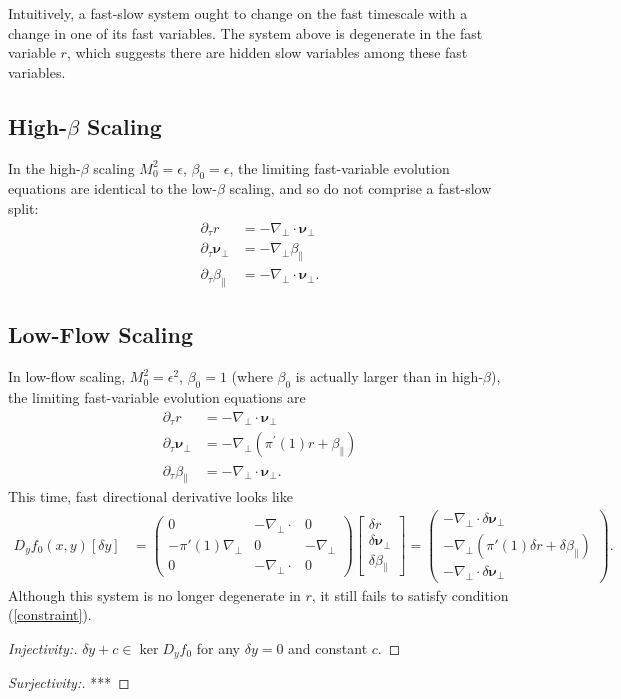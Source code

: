 \documentclass{article}
\newcommand{\para}{\parallel}
\newcommand{\ep}{\epsilon}
\newcommand{\np}{\nabla_\perp}
\newcommand{\p}{\partial}
\newcommand{\pth} [1] {\left( #1 \right) }
\newcommand{\bmat} [1] {\begin{bmatrix} #1 \end{bmatrix}}
\newcommand{\pmat} [1] {\begin{pmatrix} #1 \end{pmatrix}}
\begin{document}
Intuitively, a fast-slow system ought to change on the fast timescale with a change in one of its fast variables. The system above is degenerate in the fast variable $r$, which suggests there are hidden slow variables among these fast variables.


\subsection{High-$\beta$ Scaling}
In the high-$\beta$ scaling $M_0^2 = \ep$, $\beta_0 = \ep$, the limiting fast-variable evolution equations are identical to the low-$\beta$ scaling, and so do not comprise a fast-slow split:
\begin{align*}
\p_\tau r & = -\np\cdot\bm{\nu}_\perp\\
\p_\tau \bm{\nu}_\perp & = -\np\beta_\para\\
\p_\tau \beta_\para & = -\np\cdot\bm{\nu}_\perp.
\end{align*}

\subsection{Low-Flow Scaling}
In low-flow scaling, $M_0^2 = \epsilon^2$, $\beta_0 = 1$ (where $\beta_0$ is actually larger than in high-$\beta$), the limiting fast-variable evolution equations are
\begin{align*}
\p_\tau r &= -\np\cdot\bm{\nu}_\perp\\
\p_\tau \bm{\nu}_\perp & = -\np (\pi^\prime(1)r + \beta_\para)\\
\p_\tau \beta_\para & = -\np\cdot\bm{\nu}_\perp.
\end{align*}
This time, fast directional derivative looks like 
\begin{align} 
    D_yf_0(x,y) [\delta y] 
    &= \pmat{0 & -\np \cdot & 0 \\ -\pi'(1)\np & 0 & -\np \\ 0 & -\np \cdot & 0}
    \bmat{\delta r \\ \delta \bm{\nu}_\perp \\ \delta \beta_\para} = \pmat{-\np \cdot \delta \bm{\nu}_\perp \\ -\np \pth{\pi'(1)\delta r + \delta \beta_\para} \\ -\np \cdot \delta \bm{\nu}_\perp}.
\end{align}
Although this system is no longer degenerate in $r$, it still fails to satisfy condition (\ref{constraint}). 
\begin{proof} [Injectivity:]
    $\delta y+c\in\ker D_yf_0$ for any $\delta y=0$ and constant $c$. 
\end{proof}
\begin{proof} [Surjectivity:]
    ***
\end{proof}
\end{document}
